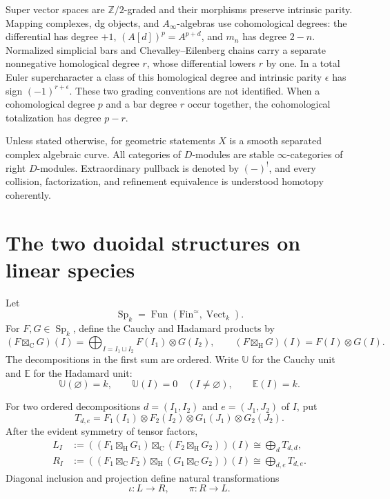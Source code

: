 \documentclass[11pt,reqno]{amsart}
\theoremstyle{definition}
\theoremstyle{remark}
\providecommand{\Fin}{\mathrm{Fin}}
\providecommand{\Hd}{\boxtimes_{\mathrm{H}}}
\providecommand{\Cy}{\boxtimes_{\mathrm{C}}}
\begin{document}
Super vector spaces are \(\mathbb Z/2\)-graded and their morphisms
preserve intrinsic parity.  Mapping complexes, dg objects, and
\(A_\infty\)-algebras use cohomological degrees: the differential has
degree \(+1\), \((A[d])^p=A^{p+d}\), and \(m_n\) has degree \(2-n\).
Normalized simplicial bars and Chevalley--Eilenberg chains carry a
separate nonnegative homological degree \(r\), whose differential lowers
\(r\) by one.  In a total Euler supercharacter a class of this
homological degree and intrinsic parity \(\epsilon\) has sign
\((-1)^{r+\epsilon}\).  These two grading conventions are not
identified.  When a cohomological degree \(p\) and a bar degree \(r\)
occur together, the cohomological totalization has degree \(p-r\).

Unless stated otherwise, for geometric statements \(X\) is a smooth separated complex
algebraic curve.  All categories of \(D\)-modules are stable
\(\infty\)-categories of right \(D\)-modules.  Extraordinary pullback is
denoted by \((-)^!\), and every collision, factorization, and refinement
equivalence is understood homotopy coherently.

\section{The two duoidal structures on linear species}

Let
\[
 \operatorname{Sp}_k
 =\operatorname{Fun}(\Fin^{\simeq},\operatorname{Vect}_k).
\]
For \(F,G\in\operatorname{Sp}_k\), define the Cauchy and Hadamard
products by
\[
 (F\Cy G)(I)
 =\bigoplus_{I=I_1\sqcup I_2}F(I_1)\otimes G(I_2),
 \qquad
 (F\Hd G)(I)=F(I)\otimes G(I).
\]
The decompositions in the first sum are ordered.  Write \(\mathbb U\)
for the Cauchy unit and \(\mathbb E\) for the Hadamard unit:
\[
 \mathbb U(\varnothing)=k,\qquad
 \mathbb U(I)=0\quad(I\ne\varnothing),\qquad
 \mathbb E(I)=k.
\]

For two ordered decompositions
\(d=(I_1,I_2)\) and \(e=(J_1,J_2)\) of \(I\), put
\[
 T_{d,e}
 =F_1(I_1)\otimes F_2(I_2)\otimes
  G_1(J_1)\otimes G_2(J_2).
\]
After the evident symmetry of tensor factors,
\[
 \begin{split}
 L_I&:=((F_1\Hd G_1)\Cy(F_2\Hd G_2))(I)
      \cong\bigoplus_dT_{d,d},\\
 R_I&:=((F_1\Cy F_2)\Hd(G_1\Cy G_2))(I)
      \cong\bigoplus_{d,e}T_{d,e}.
 \end{split}
\]
Diagonal inclusion and projection define natural transformations
\[
 \iota:L\longrightarrow R,\qquad
 \pi:R\longrightarrow L.
\]
\end{document}
